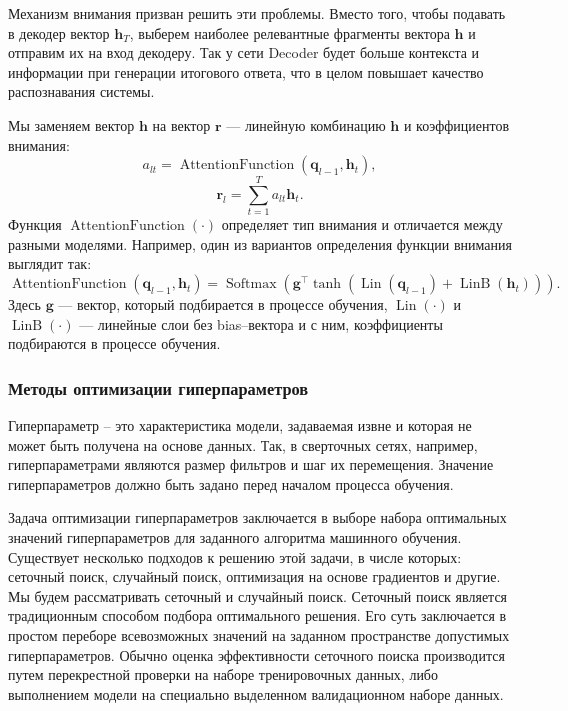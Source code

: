 Механизм внимания призван решить эти проблемы. Вместо того, чтобы подавать в декодер вектор $\mathbf{h}_T$, выберем наиболее релевантные фрагменты вектора $\mathbf{h}$ и отправим их на вход декодеру. Так у сети Decoder будет больше контекста и информации при генерации итогового ответа, что в целом повышает качество распознавания системы.

Мы заменяем вектор $\mathbf{h}$ на вектор $\mathbf{r}$ --- линейную комбинацию $\mathbf{h}$ и коэффициентов внимания:
$$a_{lt} = \operatorname{AttentionFunction}(\mathbf{q}_{l - 1}, \mathbf{h}_t),$$
$$\mathbf{r}_l = \sum_{t = 1}^{T} a_{lt}\mathbf{h}_t.$$
Функция $\operatorname{AttentionFunction}(\cdot)$ определяет тип внимания и отличается между разными моделями. Например, один из вариантов определения функции внимания выглядит так:
$$\operatorname{AttentionFunction}(\mathbf{q}_{l - 1}, \mathbf{h}_t) = \operatorname{Softmax}(\mathbf{g}^\top \tanh(\operatorname{Lin}(\mathbf{q}_{l - 1}) + \operatorname{LinB}(\mathbf{h}_t))).$$
Здесь $\mathbf{g}$ --- вектор, который подбирается в процессе обучения, $\operatorname{Lin}(\cdot)$ и $\operatorname{LinB}(\cdot)$ --- линейные слои без bias--вектора и с ним, коэффициенты подбираются в процессе обучения.

\subsubsection{Методы оптимизации гиперпараметров}
Гиперпараметр -- это характеристика модели, задаваемая извне и которая не может быть получена на основе данных. Так, в сверточных сетях, например, гиперпараметрами являются размер фильтров и шаг их перемещения. Значение гиперпараметров должно быть задано перед началом процесса обучения.

Задача оптимизации гиперпараметров\cite{hyperparamopt-overview} заключается в выборе набора оптимальных значений гиперпараметров для заданного алгоритма машинного обучения. Существует несколько подходов к решению этой задачи, в числе которых: сеточный поиск, случайный поиск, оптимизация на основе градиентов и другие.
Мы будем рассматривать сеточный и случайный поиск. Сеточный поиск является традиционным способом подбора оптимального решения. Его суть заключается в простом переборе всевозможных значений на заданном пространстве допустимых гиперпараметров. Обычно оценка эффективности сеточного поиска производится путем перекрестной проверки на наборе тренировочных данных, либо выполнением модели на специально выделенном валидационном наборе данных.

